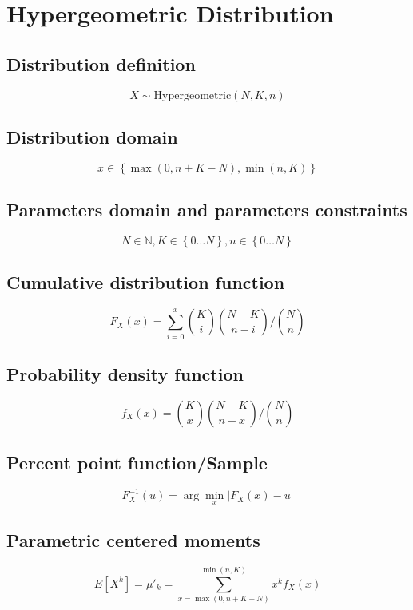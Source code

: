 \documentclass{article}
\begin{document}
\newpage
\section{Hypergeometric Distribution}
\subsection{Distribution definition}
\begin{equation*} X\sim\mathrm{Hypergeometric}\left(N,K,n\right) \end{equation*}
\subsection{Distribution domain}
\begin{equation*} x\in\left\{\max{(0,n+K-N)}, \min{(n, K )}\right\} \end{equation*}
\subsection{Parameters domain and parameters constraints}
\begin{equation*} N\in\mathbb{N}, K\in\left\{0\dots N\right\}, n\in\left\{0\dots N\right\} \end{equation*}
\subsection{Cumulative distribution function}
\begin{equation*} F_{X}\left(x\right)=\sum_{i=0}^{x}\binom{K}{i}\binom{N-K}{n-i}\bigg/\binom{N}{n} \end{equation*}
\subsection{Probability density function}
\begin{equation*} f_{X}\left(x\right)=\binom{K}{x}\binom{N-K}{n-x}\bigg/\binom{N}{n} \end{equation*}
\subsection{Percent point function/Sample}
\begin{equation*} F^{-1}_{X}\left(u\right)=\arg\min_{x}\left| F_{X}\left(x\right)-u \right| \end{equation*}
\subsection{Parametric centered moments}
\begin{equation*} E[X^k]=\mu'_{k}=\sum_{x=\max{(0,n+K-N)}}^{\min{(n, K )}}x^{k}f_{X}\left(x\right) \end{equation*}
\end{document}
